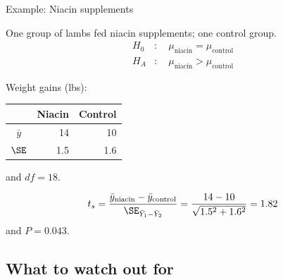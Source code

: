\begin{frame}{Example: Niacin supplements}

  One group of lambs fed niacin supplements; one control group.  
  \begin{align*}
    H_0 &: \quad \mu_\text{niacin} = \mu_\text{control}  \\
    H_A &: \quad \mu_\text{niacin} > \mu_\text{control}  
  \end{align*}


    \vspace{2em}

  
  Weight gains (lbs):
    \begin{center}
      \begin{tabular}{c|rr}
            & Niacin & Control \\
          \hline
          $\bar y$ & 14 & 10 \\
          $\SE$ & 1.5 & 1.6 \\
     \end{tabular}
   \end{center}
   and $df = 18$.


    \vspace{2em}
    \pause

    \[
    t_s = \frac{ \bar y_\text{niacin} - \bar y_\text{control} }{ \SE_{\bar Y_1 - \bar Y_2} } = \frac{ 14 - 10 }{ \sqrt{ 1.5^2 + 1.6^2 } } = 1.82
    \]
    and $P = 0.043$.
    \pause

\end{frame}


\subsection{What to watch out for}

